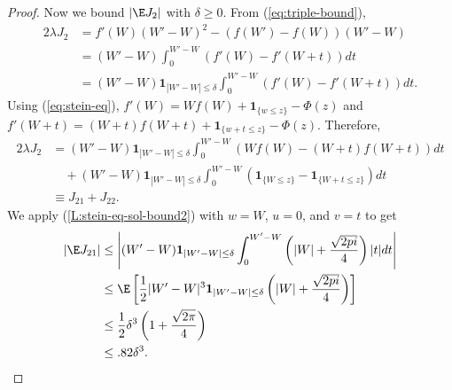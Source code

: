 \begin{proof}
  Now we bound $|\E J_2|$ with $\delta \geq 0$.  From (\ref{eq:triple-bound}),
  \begin{align*}
    2 \lambda J_2 &= f'(W)(W'-W)^2-(f(W')-f(W))(W'-W) \\
    &= (W'-W) \int_0^{W'-W}(f'(W) - f'(W+t)) dt \\
    &= (W'-W) \mathbf{1}_{|W'-W| \leq \delta} \int_0^{W'-W}(f'(W)-f'(W+t)) dt.
  \end{align*}
  Using (\ref{eq:stein-eq}), $f'(W) = Wf(W) + \mathbf{1}_{\{w \leq z\}} - \Phi(z)$ and 
  $f'(W + t) = (W + t)f(W + t) + \mathbf{1}_{\{w + t \leq z\}} - \Phi(z)$. Therefore,
  \begin{align*}
    2 \lambda J_2 &= (W'-W) \mathbf{1}_{|W'-W| \leq \delta} \int_0^{W'-W}(Wf(W)-(W+t)f(W+t)) dt \\
    &\quad + (W'-W) \mathbf{1}_{|W'-W| \leq \delta} \int_0^{W'-W}(\mathbf{1}_{\{W \leq z\}} - \mathbf{1}_{\{W + t \leq z\}}) dt \\
    &\equiv J_{21} + J_{22}.
  \end{align*}
  We apply (\ref{L:stein-eq-sol-bound2}) with $w = W$, $u = 0$, and $v = t$ to get
  \begin{align*}
    |\E J_{21}| &\leq \left | 
    (W'-W) \mathbf{1}_{|W'-W| \leq \delta} \int_0^{W'-W} \left( |W| + \frac{\sqrt{2 pi}}{4} \right ) |t| dt
    \right | \\
    &\leq \E \left [ 
      \frac{1}{2} |W' - W|^3 \mathbf{1}_{|W'-W| \leq \delta} \left( |W| + \frac{\sqrt{2 pi}}{4} \right )
    \right ] \\
    &\leq \frac{1}{2} \delta^3 \left ( 1 + \frac{\sqrt{2 \pi}}{4} \right ) \\
    &\leq .82 \delta^3.
  \end{align*}
  

\end{proof}
